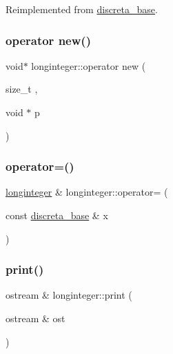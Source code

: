 Reimplemented from \mbox{\hyperlink{classdiscreta__base_a6f5d6422a0040950415db30e39dafd19}{discreta\+\_\+base}}.

\mbox{\label{classlonginteger_abbeec081da2c8cb237da0e0980e4919a}} 
\subsubsection{\texorpdfstring{operator new()}{operator new()}}
{\footnotesize\ttfamily void$\ast$ longinteger\+::operator new (\begin{DoxyParamCaption}\item[{size\+\_\+t}]{,  }\item[{void $\ast$}]{p }\end{DoxyParamCaption})\hspace{0.3cm}{\ttfamily [inline]}}

\mbox{\label{classlonginteger_a73681df1cab8ee88c85617574939fd0c}} 
\subsubsection{\texorpdfstring{operator=()}{operator=()}}
{\footnotesize\ttfamily \mbox{\hyperlink{classlonginteger}{longinteger}} \& longinteger\+::operator= (\begin{DoxyParamCaption}\item[{const \mbox{\hyperlink{classdiscreta__base}{discreta\+\_\+base}} \&}]{x }\end{DoxyParamCaption})}

\mbox{\label{classlonginteger_a21d99160318418ba5bc8318254d2caf8}} 
\subsubsection{\texorpdfstring{print()}{print()}}
{\footnotesize\ttfamily ostream \& longinteger\+::print (\begin{DoxyParamCaption}\item[{ostream \&}]{ost }\end{DoxyParamCaption})\hspace{0.3cm}{\ttfamily [virtual]}}



